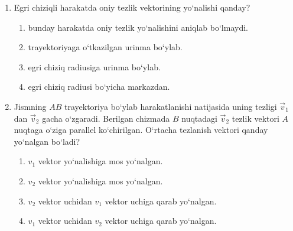 \begin{enumerate}
\item Egri chiziqli harakatda oniy tezlik vektorining yo‘nalishi qanday?
\begin{enumerate}[label=\Alph*)]
\item bunday harakatda oniy tezlik yo‘nalishini aniqlab bo‘lmaydi.
\item trayektoriyaga o‘tkazilgan urinma bo‘ylab.
\item egri chiziq radiusiga urinma bo‘ylab.
\item egri chiziq radiusi bo‘yicha markazdan.

\end{enumerate}

\item Jismning $AB$ trayektoriya bo‘ylab harakatlanishi natijasida uning tezligi $\vec{v}_1$ dan $\vec{v}_2$ gacha o‘zgaradi. Berilgan chizmada $B$ nuqtadagi $\vec{v}_2$ tezlik vektori $A$ nuqtaga o‘ziga parallel ko‘chirilgan. O‘rtacha tezlanish vektori qanday yo‘nalgan bo‘ladi?


\begin{enumerate}[label=\Alph*)]
\item $v_1$ vektor yo‘nalishiga mos yo‘nalgan.
\item $v_2$ vektor yo‘nalishiga mos yo‘nalgan.
\item $v_2$ vektor uchidan $v_1$ vektor uchiga qarab yo‘nalgan.
\item $v_1$ vektor uchidan $v_2$ vektor uchiga qarab yo‘nalgan.


\end{enumerate}
\end{enumerate}
